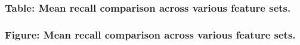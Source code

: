 \documentclass[letterpaper]{article}
\begin{document}
\subsubsection[Table: Mean recall comparison across various feature sets.]{\textbf{Table:} Mean recall comparison across
various feature sets.}
\centering
{}
\par
\subsubsection[Figure: Mean recall comparison across various feature sets.]{\textbf{Figure:} Mean recall comparison
across various feature sets.}

\bigskip


\bigskip


\bigskip


\bigskip


\bigskip


\bigskip


\bigskip
\end{document}

